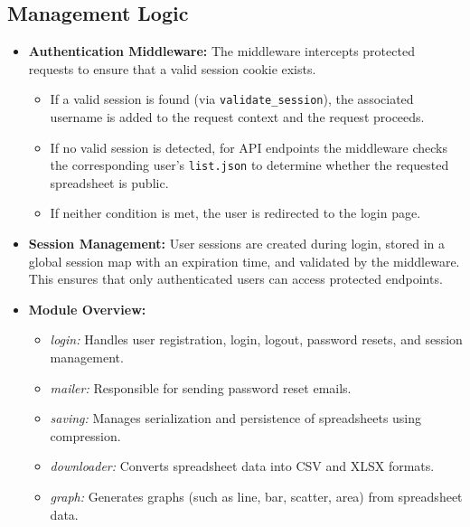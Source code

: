 \documentclass[10pt,a4paper]{article}  %
\begin{document}
\begin{enumerate}
\subsection{Management Logic}
\begin{itemize}
    \item \textbf{Authentication Middleware:} The middleware intercepts protected requests to ensure that a valid session cookie exists.
    \begin{itemize}
        \item If a valid session is found (via \texttt{validate\_session}), the associated username is added to the request context and the request proceeds.
        \item If no valid session is detected, for API endpoints the middleware checks the corresponding user’s \texttt{list.json} to determine whether the requested spreadsheet is public.
        \item If neither condition is met, the user is redirected to the login page.
    \end{itemize}
    \item \textbf{Session Management:} User sessions are created during login, stored in a global session map with an expiration time, and validated by the middleware. This ensures that only authenticated users can access protected endpoints.
    \item \textbf{Module Overview:} 
    \begin{itemize}
        \item \textit{login:} Handles user registration, login, logout, password resets, and session management.
        \item \textit{mailer:} Responsible for sending password reset emails.
        \item \textit{saving:} Manages serialization and persistence of spreadsheets using compression.
        \item \textit{downloader:} Converts spreadsheet data into CSV and XLSX formats.
        \item \textit{graph:} Generates graphs (such as line, bar, scatter, area) from spreadsheet data.
    \end{itemize}
\end{itemize}
    
\end{enumerate}
\end{document}
